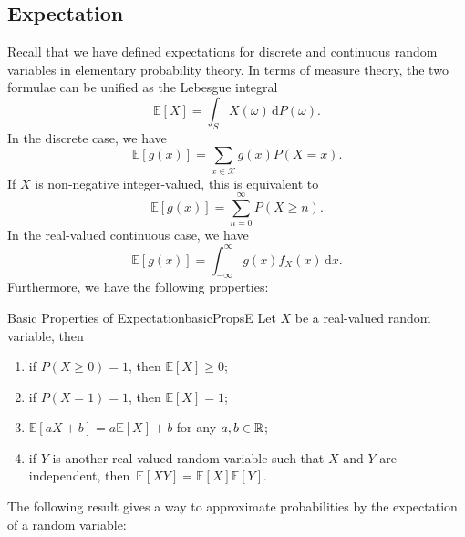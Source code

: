 \documentclass[math, code]{amznotes}
\theoremstyle{remark}
\renewcommand{\d}{\mathrm{d}}
\begin{document}
\subsection{Expectation}
Recall that we have defined expectations for discrete and continuous random variables in elementary probability theory. In terms of measure theory, the two formulae can be unified as the Lebesgue integral
\begin{equation*}
    \mathbb{E}\left[X\right] = \int_{S}\!X\left(\omega\right)\,\d P\left(\omega\right).
\end{equation*}
In the discrete case, we have 
\begin{equation*}
    \mathbb{E}\left[g\left(x\right)\right] = \sum_{x \in \mathcal{X}}g\left(x\right)P\left(X = x\right).
\end{equation*}
If $X$ is non-negative integer-valued, this is equivalent to 
\begin{equation*}
    \mathbb{E}\left[g\left(x\right)\right] = \sum_{n = 0}^{\infty}P\left(X \geq n\right).
\end{equation*}
In the real-valued continuous case, we have 
\begin{equation*}
    \mathbb{E}\left[g\left(x\right)\right] = \int_{-\infty}^{\infty}\!g\left(x\right)f_X\left(x\right)\,\d x.
\end{equation*}
Furthermore, we have the following properties:
\begin{probox}{Basic Properties of Expectation}{basicPropsE}
    Let $X$ be a real-valued random variable, then
    \begin{enumerate}
        \item if $P\left(X \geq 0\right) = 1$, then $\mathbb{E}\left[X\right] \geq 0$;
        \item if $P\left(X = 1\right) = 1$, then $\mathbb{E}\left[X\right] = 1$;
        \item $\mathbb{E}\left[aX + b\right] = a\mathbb{E}\left[X\right] + b$ for any $a, b \in \mathbb{R}$;
        \item if $Y$ is another real-valued random variable such that $X$ and $Y$ are independent, then~$\mathbb{E}\left[XY\right] = \mathbb{E}\left[X\right]\mathbb{E}\left[Y\right]$.
    \end{enumerate} 
\end{probox}
The following result gives a way to approximate probabilities by the expectation of a random variable:
\end{document}
